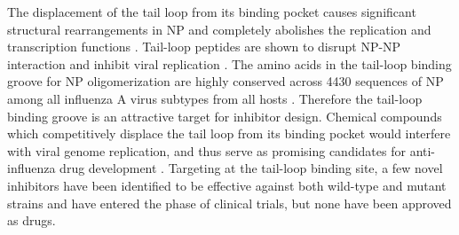 
The displacement of the tail loop from its binding pocket causes significant structural rearrangements in NP and completely abolishes the replication and transcription functions \citep{1231}. Tail-loop peptides are shown to disrupt NP-NP interaction and inhibit viral replication \citep{1233}. The amino acids in the tail-loop binding groove for NP oligomerization are highly conserved across 4430 sequences of NP among all influenza A virus subtypes from all hosts \citep{1513}. Therefore the tail-loop binding groove is an attractive target for inhibitor design. Chemical compounds which competitively displace the tail loop from its binding pocket would interfere with viral genome replication, and thus serve as promising candidates for anti-influenza drug development \citep{1140,1231,1232,1233}. Targeting at the tail-loop binding site, a few novel inhibitors \citep{1233,1516} have been identified to be effective against both wild-type and mutant strains and have entered the phase of clinical trials, but none have been approved as drugs.%

